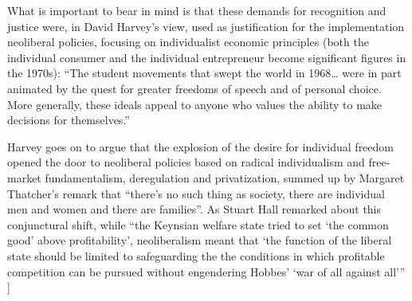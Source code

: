 \documentclass[12pt,oneside]{memoir}
\begin{document}
What is important to bear in mind is that these demands for recognition and justice were, in David Harvey's view, used as justification for the implementation neoliberal policies, focusing on  individualist economic principles (both the individual consumer and the individual entrepreneur become significant figures in the 1970s): ``The student movements that swept the world in 1968{\ldots} were in part animated by the quest for greater freedoms of speech and of personal choice. More generally, these ideals appeal to anyone who values the ability to make decisions for themselves.'' \citep[5]{harvey-2005}

Harvey goes on to argue that the explosion of the desire for individual freedom opened the door to neoliberal policies based on radical individualism and free-market fundamentalism, deregulation and privatization, summed up by Margaret Thatcher's remark that ``there's no such thing as society, there are individual men and women and there are families''. As Stuart Hall remarked about this conjunctural shift, while ``the Keynsian welfare state tried to set `the common good' above profitability', neoliberalism meant that `the function of the liberal state should be limited to safeguarding the the conditions in which profitable competition can be pursued without engendering Hobbes' `war of all against all''' \citep[707]{hall-2011} ]
\end{document}
